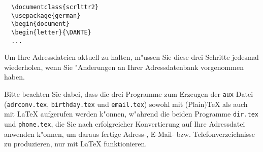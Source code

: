 \documentclass{article}
\newcommand*{\File}[1]{\texttt{#1}}
\begin{document}
\begin{small}
\begin{verbatim}
  \documentclass{scrlttr2}
  \usepackage{german}
  \begin{document}
  \begin{letter}{\DANTE}
  ...
\end{verbatim}
\end{small}

Um Ihre Adressdateien aktuell zu halten, m"ussen Sie diese drei 
Schritte jedesmal wiederholen, wenn Sie "Anderungen an Ihrer 
Adressdatenbank vorgenommen haben.

Bitte beachten Sie dabei, dass die drei Programme zum Erzeugen der
\File{aux}-Datei (\File{adrconv.tex}, \File{birthday.tex} und
\File{email.tex}) sowohl mit (Plain)\TeX{} als auch mit \LaTeX{}
aufgerufen werden k"onnen, w"ahrend die beiden Programme
\File{dir.tex} und \File{phone.tex}, die Sie nach erfolgreicher
Konvertierung auf Ihre Adressdatei anwenden k"onnen, um daraus fertige
Adress-, E-Mail- bzw. 
Telefonverzeichnisse zu produzieren, nur mit \LaTeX{}
funktionieren.
\end{document}
